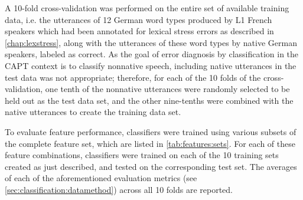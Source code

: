 		A 10-fold cross-validation was performed on the entire set of available training data, i.e. the utterances of 12 German word types produced by L1 French speakers which had been annotated for lexical stress errors as described in \cref{chap:lexstress}, along with the	utterances of these word types by native German speakers, labeled as correct. As the goal of  error diagnosis by classification in the CAPT context is to classify nonnative speech, including native utterances in the test data was not appropriate; therefore, for each of the 10 folds of the cross-validation, one tenth of the nonnative utterances were randomly selected to be held out as the test data set, and the other nine-tenths were combined with the native utterances to create the training data set. 
		
		To evaluate feature performance, classifiers were trained using various subsets of the complete feature set,
		which are listed in \cref{tab:features:sets}. For each of these feature combinations, classifiers were trained on each of the 10 training sets created as just described, and tested on the corresponding test set. The averages of each of the aforementioned evaluation metrics (see \cref{sec:classification:datamethod}) across all 10 folds are reported.

